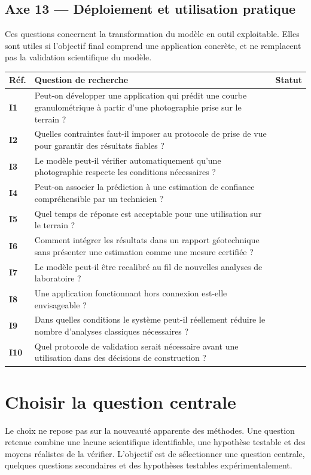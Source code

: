 \documentclass[11pt,a4paper]{article}
\makeatletter
\newenvironment{qtable}{%
  \par\smallskip
  \begin{longtable}{@{}>{\bfseries}p{1.0cm} p{12.3cm} p{1.5cm}@{}}
  \toprule
  \textbf{Réf.} & \textbf{Question de recherche} & \textbf{Statut}\\
  \midrule
  \endhead
}{%
  \bottomrule
  \end{longtable}
}
\makeatother
\begin{document}
\subsection*{Axe 13 --- Déploiement et utilisation pratique}
Ces questions concernent la transformation du modèle en outil exploitable. Elles sont utiles si l'objectif final comprend une application concrète, et ne remplacent pas la validation scientifique du modèle.
\begin{qtable}
I1 & Peut-on développer une application qui prédit une courbe granulométrique à partir d'une photographie prise sur le terrain ? & \\
I2 & Quelles contraintes faut-il imposer au protocole de prise de vue pour garantir des résultats fiables ? & \\
I3 & Le modèle peut-il vérifier automatiquement qu'une photographie respecte les conditions nécessaires ? & \\
I4 & Peut-on associer la prédiction à une estimation de confiance compréhensible par un technicien ? & \\
I5 & Quel temps de réponse est acceptable pour une utilisation sur le terrain ? & \\
I6 & Comment intégrer les résultats dans un rapport géotechnique sans présenter une estimation comme une mesure certifiée ? & \\
I7 & Le modèle peut-il être recalibré au fil de nouvelles analyses de laboratoire ? & \\
I8 & Une application fonctionnant hors connexion est-elle envisageable ? & \\
I9 & Dans quelles conditions le système peut-il réellement réduire le nombre d'analyses classiques nécessaires ? & \\
I10 & Quel protocole de validation serait nécessaire avant une utilisation dans des décisions de construction ? & \\
\end{qtable}

\section{Choisir la question centrale}

Le choix ne repose pas sur la nouveauté apparente des méthodes. Une question retenue combine une lacune scientifique identifiable, une hypothèse testable et des moyens réalistes de la vérifier. L'objectif est de sélectionner une question centrale, quelques questions secondaires et des hypothèses testables expérimentalement.
\end{document}
